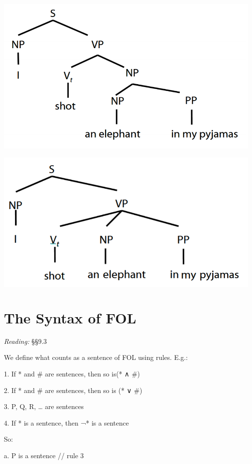 \documentclass[12pt]{extarticle}
\begin{document}
\begin{multicols*}{3}
\begin{center}
\includegraphics[scale=0.3]{img/groucho1.png}
\end{center}
\begin{center}
\includegraphics[scale=0.3]{img/groucho2.png}
\end{center}
 
 
\section{The Syntax of FOL}
 
\emph{Reading:} §§9.3
 
We define what counts as a sentence of FOL using rules. E.g.:
 
1. If * and \# are sentences, then so is(* ∧ \#)
 
2. If * and \# are sentences, then so is (* ∨ \#)
 
3. P, Q, R, … are sentences
 
4. If * is a sentence, then ¬* is a sentence
 
So:
 
a. P is a sentence // rule 3
 

\end{multicols*}
\end{document}

